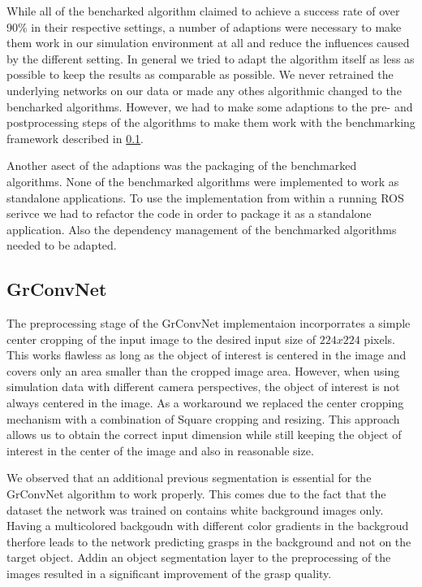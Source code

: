 While all of the bencharked algorithm claimed to achieve a success rate of over 90\% in their respective settings, a number of adaptions were necessary to
make them work in our simulation environment at all and reduce the influences caused by the different setting.
In general we tried to adapt the algorithm itself as less as possible to keep the results as comparable as possible.
We never retrained the underlying networks on our data or made any othes algorithmic changed to the bencharked algorithms.
However, we had to make some adaptions to the pre- and postprocessing steps of the algorithms to make them work with the benchmarking framework described in \ref{}.

Another asect of the adaptions was the packaging of the benchmarked algorithms.
None of the benchmarked algorithms were implemented to work as standalone applications.
To use the implementation from within a running ROS serivce we had to refactor the code in order to package it as a standalone application.
Also the dependency management of the benchmarked algorithms needed to be adapted.


\subsection{GrConvNet}
The preprocessing stage of the GrConvNet implementaion incorporrates a simple center cropping of the input image to the desired input size of $224x224$ pixels.
This works flawless as long as the object of interest is centered in the image and covers only an area smaller than the cropped image area.
However, when using simulation data with different camera perspectives, the object of interest is not always centered in the image.
As a workaround we replaced the center cropping mechanism with a combination of Square cropping and resizing.
This approach allows us to obtain the correct input dimension while still keeping the object of interest in the center of the image and also in reasonable size.

We observed that an additional previous segmentation is essential for the GrConvNet algorithm to work properly.
This comes due to the fact that the dataset the network was trained on contains white background images only.
Having a multicolored backgoudn with different color gradients in the backgroud therfore leads to the network predicting grasps in the background and not on the target object.
Addin an object segmentation layer to the preprocessing of the images resulted in a significant improvement of the grasp quality.

